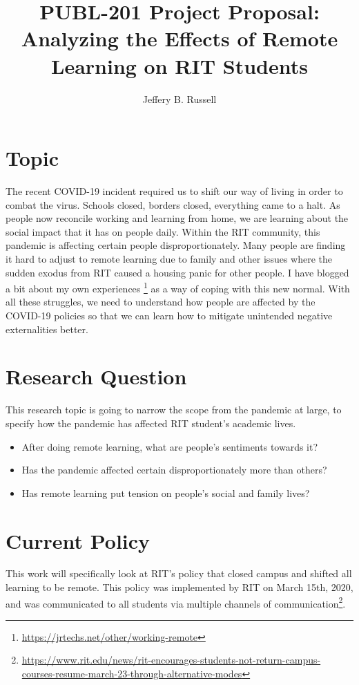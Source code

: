 \documentclass[12pt]{apa6}
\title{PUBL-201 Project Proposal: Analyzing the Effects of Remote Learning on RIT Students}
\author{Jeffery B. Russell}
\affiliation{%
 Fourth Year Computer Science Student at RIT\\
 CUBRC Research Assistant\\
 RITlug President
}%
\begin{document}
\maketitle

\section{Topic}

The recent COVID-19 incident required us to shift our way of living in order to combat the virus. Schools closed, borders closed, everything came to a halt. As people now reconcile working and learning from home, we are learning about the social impact that it has on people daily. Within the RIT community, this pandemic is affecting certain people disproportionately. Many people are finding it hard to adjust to remote learning due to family and other issues where the sudden exodus from RIT caused a housing panic for other people. I have blogged a bit about my own experiences \footnote{\url{https://jrtechs.net/other/working-remote}} as a way of coping with this new normal. With all these struggles, we need to understand how people are affected by the COVID-19 policies so that we can learn how to mitigate unintended negative externalities better. 

\section{Research Question}

This research topic is going to narrow the scope from the pandemic at large, to specify how the pandemic has affected RIT student's academic lives.

\begin{itemize}
    \item After doing remote learning, what are people's sentiments towards it?
    \item Has the pandemic affected certain disproportionately more than others?
    \item Has remote learning put tension on people's social and family lives?
\end{itemize}

\section{Current Policy}

This work will specifically look at RIT's policy that closed campus and shifted all learning to be remote. This policy was implemented by RIT on March 15th, 2020, and was communicated to all students via multiple channels of communication\footnote{\url{https://www.rit.edu/news/rit-encourages-students-not-return-campus-courses-resume-march-23-through-alternative-modes}}.
\end{document}
